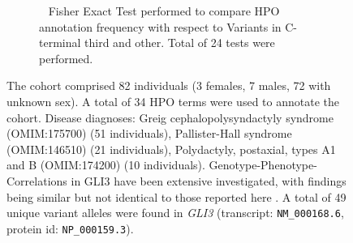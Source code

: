 \begin{figure}[htbp]
\vspace{0.4em}
\begin{subfigure}[b]{0.95\textwidth}
\centering
{}
\captionsetup{justification=raggedright,singlelinecheck=false}
\caption{         Fisher Exact Test performed to compare HPO annotation frequency with respect to Variants in C-terminal third and other. Total of
        24 tests were performed. }
\end{subfigure}
\vspace{0.4em}
\caption{ The cohort comprised 82 individuals (3 females, 7 males, 72 with unknown sex). A total of 34 HPO terms were used to annotate the cohort. Disease diagnoses: Greig cephalopolysyndactyly syndrome (OMIM:175700) (51 individuals), Pallister-Hall syndrome (OMIM:146510) (21 individuals), Polydactyly, postaxial, types A1 and B (OMIM:174200) (10 individuals). Genotype-Phenotype-Correlations in GLI3 have been extensive investigated, with findings being similar 
but not identical to those reported here \cite{PMID_15739154,PMID_22903559,PMID_33058447,PMID_24736735,PMID_9354780,PMID_28224613,PMID_34482537}. A total of 49 unique variant alleles were found in \textit{GLI3} (transcript: \texttt{NM\_000168.6}, protein id: \texttt{NP\_000159.3}).}
\end{figure}
